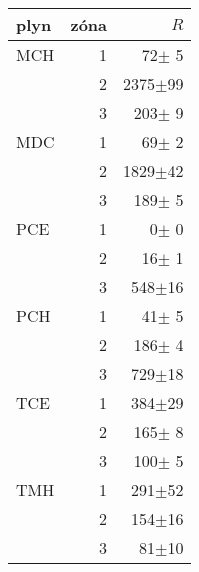 \begin{tabular}{lrr}
\toprule
plyn & zóna  &    $R$\\
\midrule
MCH & 1 &    72$\pm$ 5 \\
    & 2 &  2375$\pm$99 \\
    & 3 &   203$\pm$ 9 \\
MDC & 1 &    69$\pm$ 2 \\
    & 2 &  1829$\pm$42 \\
    & 3 &   189$\pm$ 5 \\
PCE & 1 &     0$\pm$ 0 \\
    & 2 &    16$\pm$ 1 \\
    & 3 &   548$\pm$16 \\
PCH & 1 &    41$\pm$ 5 \\
    & 2 &   186$\pm$ 4 \\
    & 3 &   729$\pm$18 \\
TCE & 1 &   384$\pm$29 \\
    & 2 &   165$\pm$ 8 \\
    & 3 &   100$\pm$ 5 \\
TMH & 1 &   291$\pm$52 \\
    & 2 &   154$\pm$16 \\
    & 3 &    81$\pm$10 \\
\bottomrule
\end{tabular}
